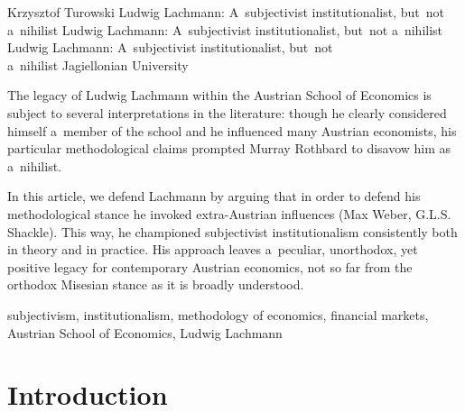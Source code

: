\begin{artengenv}{Krzysztof Turowski}
	{Ludwig Lachmann: A~subjectivist institutionalist, but~not a~nihilist}
	{Ludwig Lachmann: A~subjectivist institutionalist, but~not a~nihilist}
	{Ludwig Lachmann: A~subjectivist institutionalist, but~not\\a~nihilist}
	{Jagiellonian University\label{turowski-first}}
	{The legacy of Ludwig Lachmann within the Austrian School of Economics is subject to several interpretations in the literature: though he clearly considered himself a~member of the school and he influenced many Austrian economists, his particular methodological claims prompted Murray Rothbard to disavow him as a~nihilist.
	
	
	
	In this article, we defend Lachmann by arguing that in order to defend his methodological stance he invoked extra-Austrian influences (Max Weber, G.L.S. Shackle). This way, he championed subjectivist institutionalism consistently both in theory and in practice. His approach leaves a~peculiar, unorthodox, yet positive legacy for contemporary Austrian economics, not so far from the orthodox Misesian stance as it is broadly understood.
	}
	{subjectivism, institutionalism, methodology of economics, financial markets, Austrian School of Economics, Ludwig Lachmann}





\section{Introduction}


\end{artengenv}
